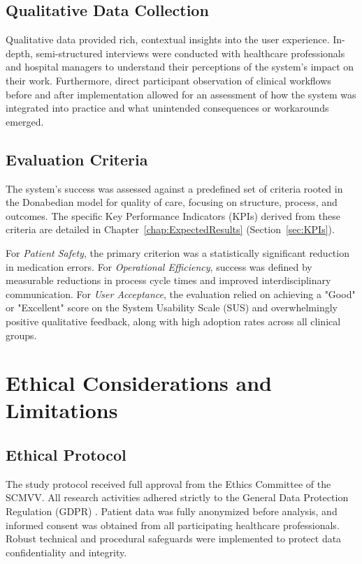\subsection{Qualitative Data Collection}
Qualitative data provided rich, contextual insights into the user experience. In-depth, semi-structured interviews were conducted with healthcare professionals and hospital managers to understand their perceptions of the system's impact on their work. Furthermore, direct participant observation of clinical workflows before and after implementation allowed for an assessment of how the system was integrated into practice and what unintended consequences or workarounds emerged.

\subsection{Evaluation Criteria}
The system's success was assessed against a predefined set of criteria rooted in the Donabedian model for quality of care, focusing on structure, process, and outcomes. The specific Key Performance Indicators (KPIs) derived from these criteria are detailed in Chapter~\ref{chap:ExpectedResults} (Section~\ref{sec:KPIs}).

For \textit{Patient Safety}, the primary criterion was a statistically significant reduction in medication errors. For \textit{Operational Efficiency}, success was defined by measurable reductions in process cycle times and improved interdisciplinary communication. For \textit{User Acceptance}, the evaluation relied on achieving a "Good" or "Excellent" score on the System Usability Scale (SUS) and overwhelmingly positive qualitative feedback, along with high adoption rates across all clinical groups.

\section{Ethical Considerations and Limitations}

\subsection{Ethical Protocol}
The study protocol received full approval from the Ethics Committee of the SCMVV. All research activities adhered strictly to the General Data Protection Regulation (GDPR) \cite{european2016}. Patient data was fully anonymized before analysis, and informed consent was obtained from all participating healthcare professionals. Robust technical and procedural safeguards were implemented to protect data confidentiality and integrity.

